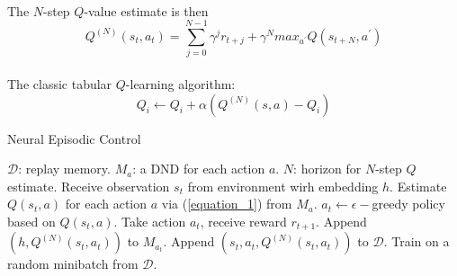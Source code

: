 \documentclass[12pt,a4paper]{article}
\begin{document}
\paragraph{}The $N$-step $Q$-value estimate is then
\begin{equation} \label{N_Step_Q_learning}
Q^{(N)}(s_{t}, a_{t}) = \sum_{j=0}^{N-1}\gamma^{j}r_{t+j} + \gamma^{N} max_{a^{'}} Q(s_{t+N}, a^{'})
\end{equation}

\paragraph{}The classic tabular $Q$-learning algorithm:
\begin{equation}\label{classic_tabular_q_learning}
Q_{i} \leftarrow Q_{i} + \alpha (Q^{(N)}(s, a) - Q_{i})
\end{equation}
\begin{algorithm}
	\caption{Neural Episodic Control}
	\begin{algorithmic}
	\State $\mathcal{D}$: replay memory.
	\State $M_{a}$: a DND for each action $a$.
	\State $N$: horizon for $N$-step $Q$ estimate.
			\State Receive observation $s_{t}$ from environment wirh embedding $h$.
			\State Estimate $Q(s_{t}, a)$ for each action $a$ via (\ref{equation_1}) from $M_{a}$.
			\State $a_{t} \leftarrow \epsilon-$greedy policy based on $Q(s_{t}, a)$.
			\State Take action $a_{t}$, receive reward $r_{t+1}$.
			\State Append $(h, Q^{(N)}(s_{t}, a_{t}))$ to $M_{a_{t}}$.
			\State Append $(s_{t}, a_{t}, Q^{(N)}(s_{t}, a_{t}))$ to $\mathcal{D}$.
			\State Train on a random minibatch from $\mathcal{D}$.
		\EndFor
	\EndFor
	\end{algorithmic}
\end{algorithm}


\end{document}
